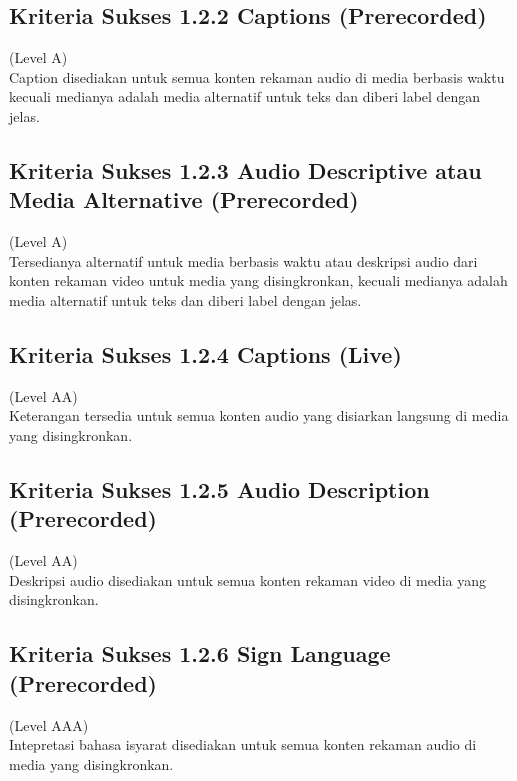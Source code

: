 \subsection{Kriteria Sukses 1.2.2 Captions (Prerecorded)}
\label{subsec:kriteria_1.2.2}
(Level A) \\

Caption disediakan untuk semua konten rekaman audio di media berbasis waktu kecuali medianya adalah media alternatif untuk teks dan diberi label dengan jelas.


\subsection{Kriteria Sukses 1.2.3 Audio Descriptive atau Media Alternative (Prerecorded)}
\label{subsec:kriteria_1.2.3}
(Level A) \\

Tersedianya alternatif untuk media berbasis waktu atau deskripsi audio dari konten rekaman video untuk media yang disingkronkan, kecuali medianya adalah media alternatif untuk teks dan diberi label dengan jelas.


\subsection{Kriteria Sukses 1.2.4 Captions (Live)}
\label{subsec:kriteria_1.2.4}
(Level AA) \\

Keterangan tersedia untuk semua konten audio yang disiarkan langsung di media yang disingkronkan.


\subsection{Kriteria Sukses 1.2.5 Audio Description (Prerecorded)}
\label{subsec:kriteria_1.2.5}
(Level AA) \\

Deskripsi audio disediakan untuk semua konten rekaman video di media yang disingkronkan.


\subsection{Kriteria Sukses 1.2.6 Sign Language (Prerecorded)}
\label{subsec:kriteria_1.2.6}
(Level AAA) \\

Intepretasi bahasa isyarat disediakan untuk semua konten rekaman audio di media yang disingkronkan.


